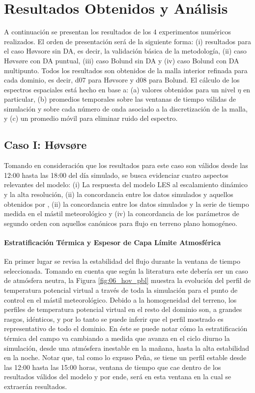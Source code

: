 \chapter{Resultados Obtenidos y Análisis}
A continuación se presentan los resultados de los 4 experimentos numéricos realizados. El orden de presentación será de la siguiente forma: (i) resultados para el caso Høvsore sin DA, es decir, la validación básica de la metodología, (ii) caso Høvsøre con DA puntual, (iii) caso Bolund sin DA y (iv) caso Bolund con DA multipunto. Todos los resultados son obtenidos de la malla interior refinada para cada dominio, es decir, d07 para Høvsore y d08 para Bolund. El cálculo de los espectros espaciales está hecho en base a: (a) valores obtenidos para un nivel $\eta$ en particular, (b) promedios temporales sobre las ventanas de tiempo válidas de simulación y sobre cada número de onda asociado a la discretización de la malla, y (c) un promedio móvil para eliminar ruido del espectro.
\section{Caso I: Høvsøre}
Tomando en consideración que los resultados para este caso son válidos desde las 12:00 hasta las 18:00 del día simulado, se busca evidenciar cuatro aspectos relevantes del modelo: (i) La respuesta del modelo LES al escalamiento dinámico y la alta resolución, (ii) la concordancia entre los datos simulados y aquellos obtenidos por \cite{Pea2013}, (ii) la concordancia entre los datos simulados y la serie de tiempo medida en el mástil meteorológico y (iv) la concordancia de los parámetros de segundo orden con aquellos canónicos para flujo en terreno plano homogéneo.

\subsubsection{Estratificación Térmica y Espesor de Capa Límite Atmosférica}
En primer lugar se revisa la estabilidad del flujo durante la ventana de tiempo seleccionada. Tomando en cuenta que según la literatura este debería ser un caso de atmósfera neutra, la Figura \ref{fig:06_hov_pbl} muestra la evolución del perfil de temperatura potencial virtual a través de toda la simulación para el punto de control en el mástil meteorológico. Debido a la homogeneidad del terreno, los perfiles de temperatura potencial virtual en el resto del dominio son, a grandes rasgos, idénticos, y por lo tanto se puede inferir que el perfil mostrado es representativo de todo el dominio. En éste se puede notar cómo la estratificación térmica del campo va cambiando a medida que avanza en el ciclo diurno la simulación, desde una atmósfera inestable en la mañana, hasta la alta estabilidad en la noche. Notar que, tal como lo expuso Peña, se tiene un perfil estable desde las 12:00 hasta las 15:00 horas, ventana de tiempo que cae dentro de los resultados válidos del modelo y por ende, será en esta ventana en la cual se extraerán resultados.


